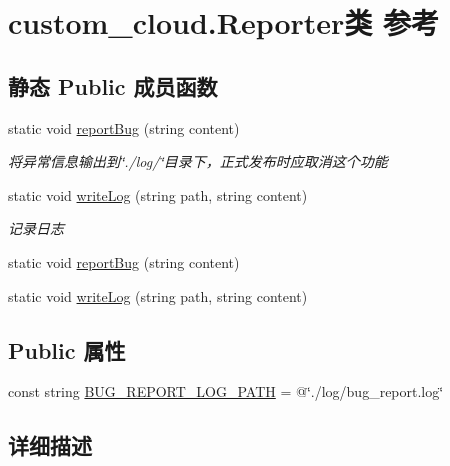 \hypertarget{classcustom__cloud_1_1_reporter}{}\section{custom\+\_\+cloud.\+Reporter类 参考}
\label{classcustom__cloud_1_1_reporter}
\subsection*{静态 Public 成员函数}
\begin{DoxyCompactItemize}
\item 
static void \hyperlink{classcustom__cloud_1_1_reporter_ab44d30e36526c47f21889d4df1e3851b}{report\+Bug} (string content)
\begin{DoxyCompactList}\small\item\em 将异常信息输出到\char`\"{}./log/\char`\"{}目录下，正式发布时应取消这个功能 \end{DoxyCompactList}\item 
static void \hyperlink{classcustom__cloud_1_1_reporter_ae1c917d6f0e059b068b5c6c0e0436293}{write\+Log} (string path, string content)
\begin{DoxyCompactList}\small\item\em 记录日志 \end{DoxyCompactList}\item 
static void \hyperlink{classcustom__cloud_1_1_reporter_ab44d30e36526c47f21889d4df1e3851b}{report\+Bug} (string content)
\item 
static void \hyperlink{classcustom__cloud_1_1_reporter_ae1c917d6f0e059b068b5c6c0e0436293}{write\+Log} (string path, string content)
\end{DoxyCompactItemize}
\subsection*{Public 属性}
\begin{DoxyCompactItemize}
\item 
const string \hyperlink{classcustom__cloud_1_1_reporter_a999ad2f96c992d72ff43590256d3a3f7}{B\+U\+G\+\_\+\+R\+E\+P\+O\+R\+T\+\_\+\+L\+O\+G\+\_\+\+P\+A\+TH} = @\char`\"{}./log/bug\+\_\+report.\+log\char`\"{}
\end{DoxyCompactItemize}


\subsection{详细描述}


